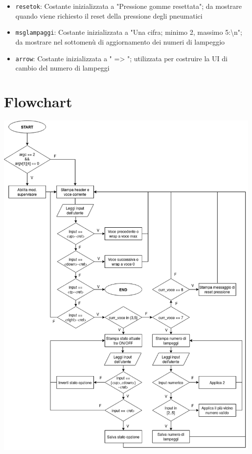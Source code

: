 \documentclass[
  12pt,
  a4paper,
  headings=optiontoheadandtoc
]{scrreprt}
\begin{document}
\begin{itemize}
\begin{itemize}
    \item \texttt{resetok}: Costante inizializzata a "Pressione gomme resettata"; da mostrare quando viene richiesto il reset della pressione degli pneumatici
    \item \texttt{msglampaggi}: Costante inizializzata a "Una cifra; minimo 2, massimo 5:\textbackslash{}n"; da mostrare nel sottomenù di aggiornamento dei numeri di lampeggio
    \item \texttt{arrow}: Costante inizializzata a " =\textgreater{} "; utilizzata per costruire la UI di cambio del numero di lampeggi
  \end{itemize}
\end{itemize}

\chapter[nonumber=true]{Flowchart}

\begin{center}
\includegraphics[height=17.8cm]{Flowchart auto_menu.drawio}
\end{center}
\end{document}
